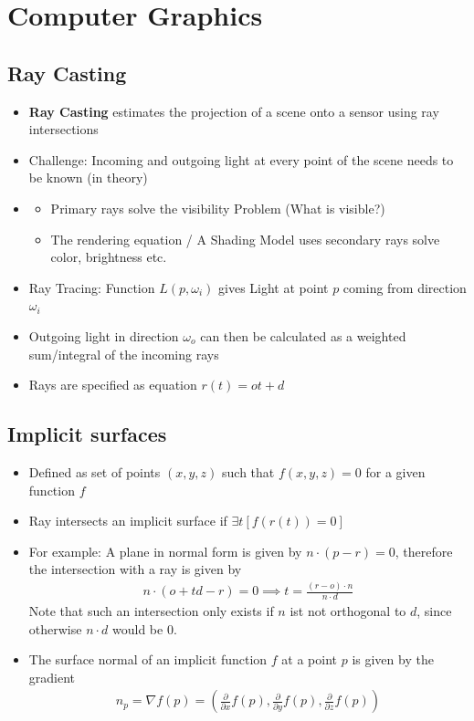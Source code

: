 \documentclass{scrartcl}
\newcommand{\Partial}[1]{\frac{\partial}{\partial #1}}
\begin{document}
\section*{Computer Graphics}
\subsection*{Ray Casting}
\begin{itemize}
    \item \textbf{Ray Casting} estimates the projection of a scene onto a sensor using ray intersections
    \item Challenge: Incoming and outgoing light at every point of the scene needs to be known (in theory)
    \item \begin{itemize}
        \item Primary rays solve the visibility Problem (What is visible?)
        \item The rendering equation / A Shading Model uses secondary rays solve color, brightness etc.
    \end{itemize}
    \item Ray Tracing: Function $L(p, \omega_i)$ gives Light at point $p$ coming from direction $\omega_i$
    \item Outgoing light in direction $\omega_o$ can then be calculated as a weighted sum/integral of the incoming rays
    \item Rays are specified as equation $r(t) = ot + d$
\end{itemize}
\subsection*{Implicit surfaces}
\begin{itemize}
    \item Defined as set of points $(x,y,z)$ such that $f(x,y,z) = 0$ for a given function $f$ 
    \item Ray intersects an implicit surface if $\exists t[f(r(t)) = 0]$
    \item For example: A plane in normal form is given by $n \cdot (p-r) = 0$, therefore the intersection with a ray is given by
    \begin{align*}
        n \cdot (o + td - r) = 0 \implies t = \frac{(r-o)\cdot n}{n \cdot d}
    \end{align*}
    Note that such an intersection only exists if $n$ ist not orthogonal to $d$, since otherwise $n \cdot d$ would be $0$.
    \item The surface normal of an implicit function $f$ at a point $p$ is given by the gradient
    \begin{align*}
        n_p = \nabla f(p) = \left(\Partial{x}f(p), \Partial{y}f(p), \Partial{z}f(p)\right)
    \end{align*}
\end{itemize}
\newpage
\end{document}
